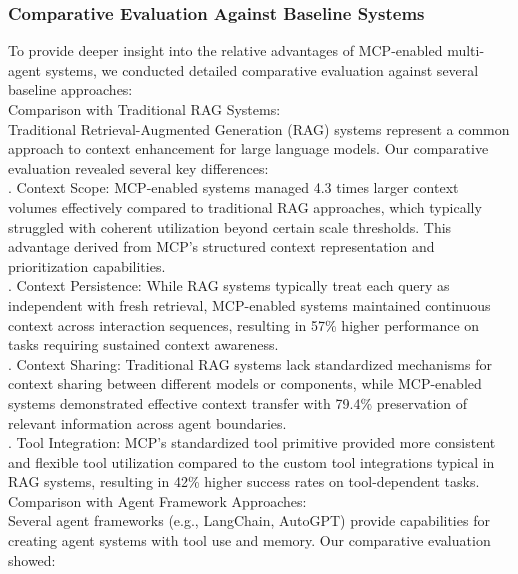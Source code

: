 \subsubsection{Comparative Evaluation Against Baseline Systems}
To provide deeper insight into the relative advantages of MCP-enabled multi-agent systems, we conducted detailed comparative evaluation against several baseline approaches:\\ \newline
Comparison with Traditional RAG Systems:\\ \newline
Traditional Retrieval-Augmented Generation (RAG) systems represent a common approach to context enhancement for large language models. Our comparative evaluation revealed several key differences:\\ . Context Scope: MCP-enabled systems managed 4.3 times larger context volumes effectively compared to traditional RAG approaches, which typically struggled with coherent utilization beyond certain scale thresholds. This advantage derived from MCP's structured context representation and prioritization capabilities.\\ . Context Persistence: While RAG systems typically treat each query as independent with fresh retrieval, MCP-enabled systems maintained continuous context across interaction sequences, resulting in 57\% higher performance on tasks requiring sustained context awareness.\\ . Context Sharing: Traditional RAG systems lack standardized mechanisms for context sharing between different models or components, while MCP-enabled systems demonstrated effective context transfer with 79.4\% preservation of relevant information across agent boundaries.\\ . Tool Integration: MCP's standardized tool primitive provided more consistent and flexible tool utilization compared to the custom tool integrations typical in RAG systems, resulting in 42\% higher success rates on tool-dependent tasks.\\ \newline
Comparison with Agent Framework Approaches:\\ \newline
Several agent frameworks (e.g., LangChain, AutoGPT) provide capabilities for creating agent systems with tool use and memory. Our comparative evaluation showed:\\ \newline

